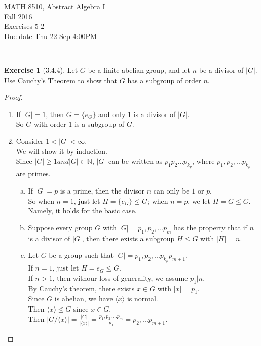 \documentclass{amsart}
\newcommand{\bbn}{\mathbb{N}}
\theoremstyle{plain}
\theoremstyle{definition}
\newtheorem{exer}[lem]{Exercise}
\begin{document}
\noindent MATH 8510, Abstract Algebra I \\
Fall 2016\\
Exercises 5-2\\
Due date Thu 22 Sep 4:00PM

\

%
%

\begin{exer}[3.4.4]
Let $G$ be a finite abelian group, and let $n$ be a divisor of $|G|$. 
Use Cauchy's Theorem to show that $G$ has a subgroup of order $n$.
\begin{proof}
	\begin{enumerate}[(1)]
		\item
		  If $|G|=1$, then $G = \{e_G\}$ and only $1$ is a divisor of $|G|$.\\
		  So $G$ with order $1$ is a subgroup of $G$.
		 \item
		 Consider $1 < |G| < \infty$.\\
		 We will show it by induction.\\
		 Since $|G|\geq 1 and |G|\in \bbn$, $|G|$ can be written as $p_1p_2...p_{k_p}$, where $p_1,p_2,...p_{k_p}$ are primes.
		 \begin{enumerate}[(a)]
		   \item
             If $|G| = p$ is a prime, then the divisor $n$ can only be $1$ or $p$.\\
             So when $n = 1$, just let $H = \{e_G\} \leq G$; when $n = p$, we let $H = G\leq G$.\\
             Namely, it holds for the basic case.
		 	 \item
		 	  Suppose every group $G$ with $|G|= p_1,p_2,...p_{m}$ has the property that if $n$ is a divisor of $|G|$, then there exists a subgroup $H \leq G$ with $|H|=n$.
		 	  \item
				Let $G$ be a group such that $|G|= p_1,p_2,...p_{k_p}p_{m + 1}$. \\
				If $n=1$, just let $H = {e_G} \leq G$.\\
				If $n > 1$, then withour loss of generality, we assume $p_1|n$.\\
				By Cauchy's theorem, there exists $x \in G$ with $|x| = p_1$. \\
				Since $G$ is abelian, we have $\langle x\rangle$ is normal.\\
				Then $\langle x\rangle \unlhd G$ since $x\in G$.\\
				Then $|G/\langle x\rangle| = \frac{|G|}{|\langle x\rangle|} = \frac{p_1,p_2,...p_{m}}{p_1} = p_2,...p_{m+1}$.\\

\end{enumerate}
\end{enumerate}
\end{proof}
\end{exer}
\end{document}
